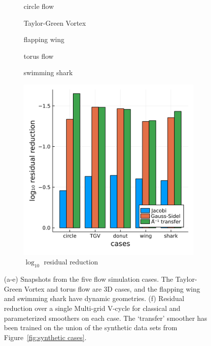 \documentclass[review]{elsarticle}
\begin{document}
\begin{figure}
    \centering
    \begin{subfigure}[b]{0.3\textwidth}
        \centering
        \caption{circle flow}
        \label{fig:circle}
    \end{subfigure}
    \begin{subfigure}[b]{0.3\textwidth}
        \centering
        \caption{Taylor-Green Vortex}
        \label{fig:TGV}
    \end{subfigure}
    \begin{subfigure}[b]{0.3\textwidth}
        \centering
        \caption{flapping wing}
        \label{fig:donut}
    \end{subfigure}
    \begin{minipage}{0.45\textwidth}
        \begin{subfigure}{\textwidth}
        \centering
        \caption{torus flow}
        \label{fig:donut}
        \end{subfigure}
        \begin{subfigure}{\textwidth}
        \centering
        \caption{swimming shark}
        \label{fig:donut}
        \end{subfigure}
    \end{minipage}
    \hfill
    \begin{subfigure}[b]{0.5\textwidth}
        \centering
        \includegraphics[width=\textwidth]{figures/compareloss.png}
        \caption{$\log_{10}$ residual reduction}
        \label{fig:synthetic time}
    \end{subfigure}
    \caption{(a-e) Snapshots from the five flow simulation cases. The Taylor-Green Vortex and torus flow are 3D cases, and the flapping wing and swimming shark have dynamic geometries. (f) Residual reduction over a single Multi-grid V-cycle for classical and parameterized smoothers on each case. The `transfer' smoother has been trained on the union of the synthetic data sets from Figure~\ref{fig:synthetic cases}.}
    \label{fig:simulation cases}
\end{figure}
\end{document}
